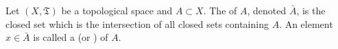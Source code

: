 Let $(X, \mathfrak{T})$ be a topological space and $A \subset X$. The  of $A$, denoted $\bar{A}$, is the closed set which is the intersection of all closed sets containing $A$. An element $x \in \bar{A}$ is called a  (or ) of $A$.
